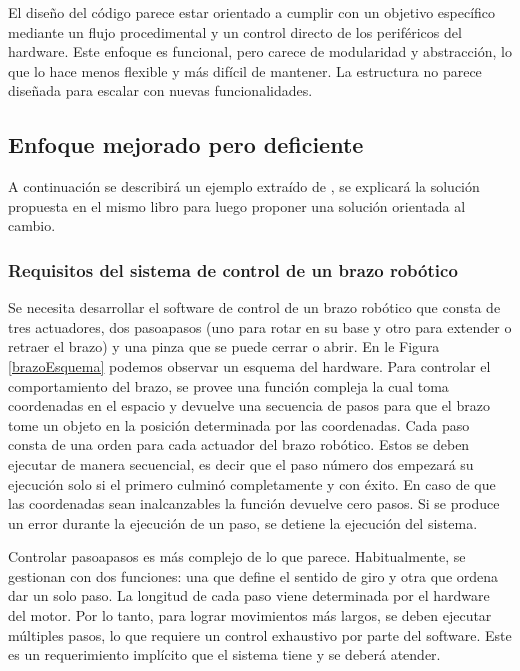 El diseño del código parece estar orientado a cumplir con un objetivo específico mediante un flujo procedimental y un control directo de los periféricos del hardware. Este enfoque es funcional, pero carece de modularidad y abstracción, lo que lo hace menos flexible y más difícil de mantener. La estructura no parece diseñada para escalar con nuevas funcionalidades.

\subsection*{Enfoque mejorado pero deficiente}

A continuación se describirá un ejemplo extraído de \cite[Sección. 3.4]{douglass}, se explicará la solución propuesta en el mismo libro para luego proponer una solución orientada al cambio.

\subsubsection*{Requisitos del sistema de control de un brazo robótico}
\label{requisitos}

Se necesita desarrollar el software de control de un brazo robótico que consta de tres \gls{actuadores}, dos \glspl{pasoapaso} (uno para rotar en su base y otro para extender o retraer el brazo) y una pinza que se puede cerrar o abrir. En le Figura \ref{brazoEsquema} podemos observar un esquema del hardware. Para controlar el comportamiento del brazo, se provee una función compleja la cual toma coordenadas en el espacio y devuelve una secuencia de pasos para que el brazo tome un objeto en la posición determinada por las coordenadas. Cada paso consta de una orden para cada actuador del brazo robótico. Estos se deben ejecutar de manera secuencial, es decir que el paso número dos empezará su ejecución solo si el primero culminó completamente y con éxito. En caso de que las coordenadas sean inalcanzables la función devuelve cero pasos. Si se produce un error durante la ejecución de un paso, se detiene la ejecución del sistema.

Controlar \glspl{pasoapaso} es más complejo de lo que parece. Habitualmente, se gestionan con dos funciones: una que define el sentido de giro y otra que ordena dar un solo paso. La longitud de cada paso viene determinada por el hardware del motor. Por lo tanto, para lograr movimientos más largos, se deben ejecutar múltiples pasos, lo que requiere un control exhaustivo por parte del software. Este es un requerimiento implícito que el sistema tiene y se deberá atender.

